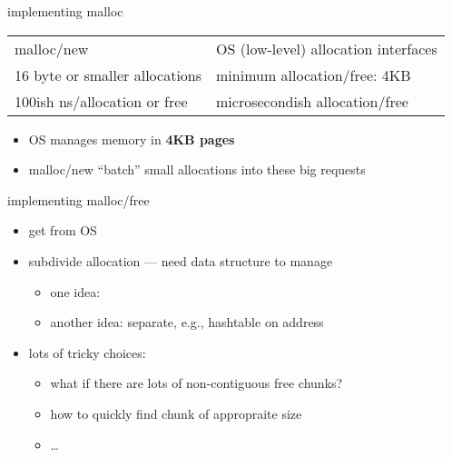 \begin{frame}{implementing malloc}
\begin{tabular}{ll}
malloc/new & OS (low-level)  allocation interfaces \\
16 byte or smaller allocations & minimum allocation/free: 4KB \\
100ish ns/allocation or free & microsecondish allocation/free \\
\end{tabular}
\begin{itemize}
\item OS manages memory in \textbf{4KB pages}
\item malloc/new ``batch'' small allocations into these big requests
\end{itemize}
\end{frame}

\begin{frame}{implementing malloc/free}
\begin{itemize}
    \item get  from OS
    \item subdivide allocation --- need data structure to manage
    \begin{itemize}
        \item one idea: 
        \item another idea: separate, e.g., hashtable on address
    \end{itemize} 
    \item<2> lots of tricky choices:
    \begin{itemize}
        \item what if there are lots of non-contiguous free chunks?
        \item how to quickly find chunk of appropraite size
        \item \ldots
    \end{itemize}
\end{itemize}
\end{frame}


